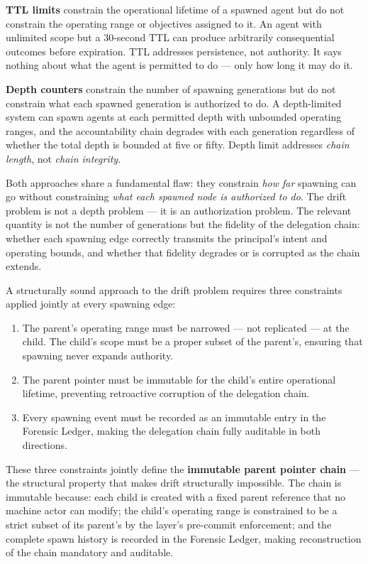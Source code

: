 \textbf{TTL limits} constrain the operational lifetime of a spawned agent but do not constrain the operating range or objectives assigned to it. An agent with unlimited scope but a 30-second TTL can produce arbitrarily consequential outcomes before expiration. TTL addresses persistence, not authority. It says nothing about what the agent is permitted to do — only how long it may do it.

\textbf{Depth counters} constrain the number of spawning generations but do not constrain what each spawned generation is authorized to do. A depth-limited system can spawn agents at each permitted depth with unbounded operating ranges, and the accountability chain degrades with each generation regardless of whether the total depth is bounded at five or fifty. Depth limit addresses \emph{chain length}, not \emph{chain integrity}.

Both approaches share a fundamental flaw: they constrain \emph{how far} spawning can go without constraining \emph{what each spawned node is authorized to do}. The drift problem is not a depth problem — it is an authorization problem. The relevant quantity is not the number of generations but the fidelity of the delegation chain: whether each spawning edge correctly transmits the principal's intent and operating bounds, and whether that fidelity degrades or is corrupted as the chain extends.

A structurally sound approach to the drift problem requires three constraints applied jointly at every spawning edge:

\begin{enumerate}
\item The parent's operating range must be narrowed — not replicated — at the child. The child's scope must be a proper subset of the parent's, ensuring that spawning never expands authority.
\item The parent pointer must be immutable for the child's entire operational lifetime, preventing retroactive corruption of the delegation chain.
\item Every spawning event must be recorded as an immutable entry in the Forensic Ledger, making the delegation chain fully auditable in both directions.
\end{enumerate}

These three constraints jointly define the \textbf{immutable parent pointer chain} — the structural property that makes drift structurally impossible. The chain is immutable because: each child is created with a fixed parent reference that no machine actor can modify; the child's operating range is constrained to be a strict subset of its parent's by the \bounds{} layer's pre-commit enforcement; and the complete spawn history is recorded in the Forensic Ledger, making reconstruction of the chain mandatory and auditable.

